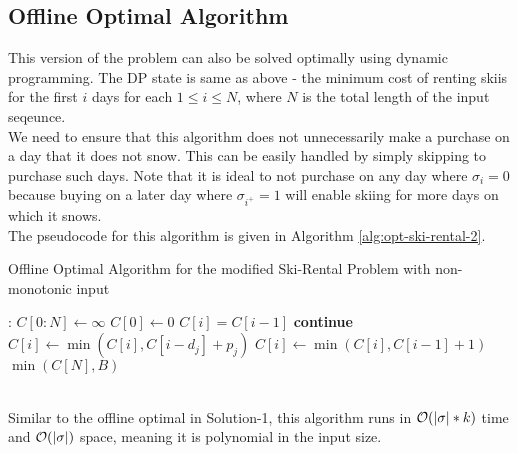 \documentclass[11pt]{article}
\newcommand{\bigO}{{\cal O}}
\begin{document}
\subsection*{Offline Optimal Algorithm}
This version of the problem can also be solved optimally using dynamic programming. The DP state is same as above - the
minimum cost of renting skiis for the first $i$ days for each $1 \leq i \leq N$, where $N$ is the total length of
the input seqeunce. \\
We need to ensure that this algorithm does not unnecessarily make a purchase on a day that it does not snow. This can be
easily handled by simply skipping to purchase such days. Note that it is ideal to not purchase on any day where
$\sigma_{i} = 0$ because buying on a later day where $\sigma_{i^{+}} = 1$ will enable skiing for more days on which it snows. \\
The pseudocode for this algorithm is given in Algorithm \ref{alg:opt-ski-rental-2}.
\begin{algorithm}
    \caption{Offline Optimal Algorithm for the modified Ski-Rental Problem with non-monotonic input}
    \label{alg:opt-ski-rental-2}
    \begin{algorithmic}[1]
        :
            \State $C[0:N] \gets \infty$
            \State $C[0] \gets 0$
                    \State $C[i] = C[i-1]$
                    \State \textbf{continue}
                \EndIf
                    \State $C[i] \gets \min{(C[i], C[i - d_{j}] + p_{j})}$
                \EndFor
                \State $C[i] \gets \min{(C[i], C[i - 1] + 1)}$ 
            \EndFor
            \State \Return $\min{(C[N], B)}$
        \EndProcedure
    \end{algorithmic}
\end{algorithm}
\vspace*{0pt} \\
Similar to the offline optimal in Solution-1, this algorithm runs in $\bigO(|\sigma|*k)$ time and $\bigO(|\sigma|)$ space,
meaning it is polynomial in the input size.
\end{document}
